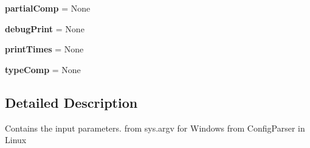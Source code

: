 \begin{DoxyCompactItemize}
\item 
\hypertarget{namespacesmoderp2d_1_1config_aacce9cc5229b52715658938bf7b7fab6}{{\bfseries partial\-Comp} = None}\label{namespacesmoderp2d_1_1config_aacce9cc5229b52715658938bf7b7fab6}

\item 
\hypertarget{namespacesmoderp2d_1_1config_a918f6cdcf5748e5a1f58df6b18c7126a}{{\bfseries debug\-Print} = None}\label{namespacesmoderp2d_1_1config_a918f6cdcf5748e5a1f58df6b18c7126a}

\item 
\hypertarget{namespacesmoderp2d_1_1config_a451e97fe1d4c4ba1c09092abd5bfc1a3}{{\bfseries print\-Times} = None}\label{namespacesmoderp2d_1_1config_a451e97fe1d4c4ba1c09092abd5bfc1a3}

\item 
\hypertarget{namespacesmoderp2d_1_1config_a057d208ea7e57b3e473526c803bc4a28}{{\bfseries type\-Comp} = None}\label{namespacesmoderp2d_1_1config_a057d208ea7e57b3e473526c803bc4a28}

\end{DoxyCompactItemize}


\subsection{Detailed Description}
Contains the input parameters. from sys.\-argv for Windows from Config\-Parser in Linux 